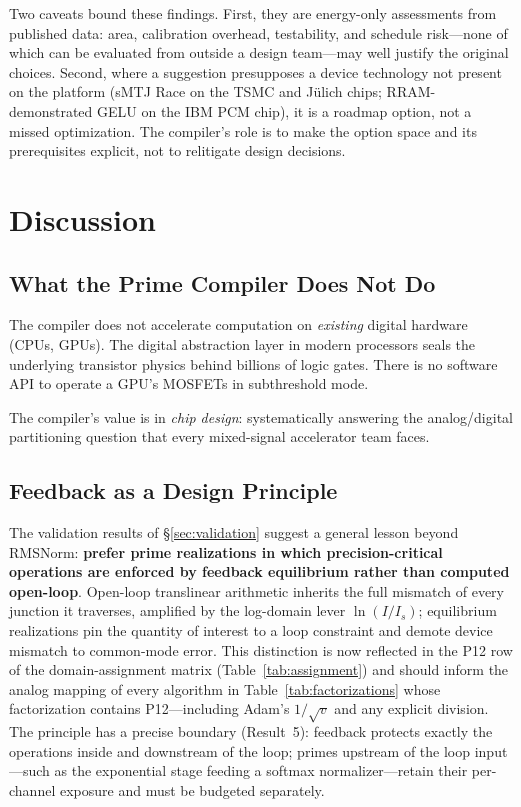 \documentclass[11pt]{article}
\begin{document}
Two caveats bound these findings. First, they are energy-only assessments from published data: area, calibration overhead, testability, and schedule risk---none of which can be evaluated from outside a design team---may well justify the original choices. Second, where a suggestion presupposes a device technology not present on the platform (sMTJ Race on the TSMC and J\"ulich chips; RRAM-demonstrated GELU on the IBM PCM chip), it is a roadmap option, not a missed optimization. The compiler's role is to make the option space and its prerequisites explicit, not to relitigate design decisions.

\section{Discussion}

\subsection{What the Prime Compiler Does Not Do}

The compiler does not accelerate computation on \textit{existing} digital hardware (CPUs, GPUs). The digital abstraction layer in modern processors seals the underlying transistor physics behind billions of logic gates. There is no software API to operate a GPU's MOSFETs in subthreshold mode.

The compiler's value is in \textit{chip design}: systematically answering the analog/digital partitioning question that every mixed-signal accelerator team faces.

\subsection{Feedback as a Design Principle}

The validation results of \S\ref{sec:validation} suggest a general lesson beyond RMSNorm: \textbf{prefer prime realizations in which precision-critical operations are enforced by feedback equilibrium rather than computed open-loop}. Open-loop translinear arithmetic inherits the full mismatch of every junction it traverses, amplified by the log-domain lever $\ln(I/I_s)$; equilibrium realizations pin the quantity of interest to a loop constraint and demote device mismatch to common-mode error. This distinction is now reflected in the P12 row of the domain-assignment matrix (Table~\ref{tab:assignment}) and should inform the analog mapping of every algorithm in Table~\ref{tab:factorizations} whose factorization contains P12---including Adam's $1/\sqrt{v}$ and any explicit division. The principle has a precise boundary (Result~5): feedback protects exactly the operations inside and downstream of the loop; primes upstream of the loop input---such as the exponential stage feeding a softmax normalizer---retain their per-channel exposure and must be budgeted separately.
\end{document}
